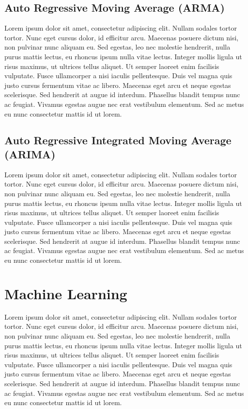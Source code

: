 \subsection{Auto Regressive Moving Average (ARMA)}
Lorem ipsum dolor sit amet, consectetur adipiscing elit. Nullam sodales tortor tortor. Nunc eget cursus dolor, id efficitur arcu. Maecenas posuere dictum nisi, non pulvinar nunc aliquam eu. Sed egestas, leo nec molestie hendrerit, nulla purus mattis lectus, eu rhoncus ipsum nulla vitae lectus. Integer mollis ligula ut risus maximus, ut ultrices tellus aliquet. Ut semper laoreet enim facilisis vulputate. Fusce ullamcorper a nisi iaculis pellentesque. Duis vel magna quis justo cursus fermentum vitae ac libero. Maecenas eget arcu et neque egestas scelerisque. Sed hendrerit at augue id interdum. Phasellus blandit tempus nunc ac feugiat. Vivamus egestas augue nec erat vestibulum elementum. Sed ac metus eu nunc consectetur mattis id ut lorem.

\subsection{Auto Regressive Integrated Moving Average (ARIMA)}
Lorem ipsum dolor sit amet, consectetur adipiscing elit. Nullam sodales tortor tortor. Nunc eget cursus dolor, id efficitur arcu. Maecenas posuere dictum nisi, non pulvinar nunc aliquam eu. Sed egestas, leo nec molestie hendrerit, nulla purus mattis lectus, eu rhoncus ipsum nulla vitae lectus. Integer mollis ligula ut risus maximus, ut ultrices tellus aliquet. Ut semper laoreet enim facilisis vulputate. Fusce ullamcorper a nisi iaculis pellentesque. Duis vel magna quis justo cursus fermentum vitae ac libero. Maecenas eget arcu et neque egestas scelerisque. Sed hendrerit at augue id interdum. Phasellus blandit tempus nunc ac feugiat. Vivamus egestas augue nec erat vestibulum elementum. Sed ac metus eu nunc consectetur mattis id ut lorem.

\section{Machine Learning}
Lorem ipsum dolor sit amet, consectetur adipiscing elit. Nullam sodales tortor tortor. Nunc eget cursus dolor, id efficitur arcu. Maecenas posuere dictum nisi, non pulvinar nunc aliquam eu. Sed egestas, leo nec molestie hendrerit, nulla purus mattis lectus, eu rhoncus ipsum nulla vitae lectus. Integer mollis ligula ut risus maximus, ut ultrices tellus aliquet. Ut semper laoreet enim facilisis vulputate. Fusce ullamcorper a nisi iaculis pellentesque. Duis vel magna quis justo cursus fermentum vitae ac libero. Maecenas eget arcu et neque egestas scelerisque. Sed hendrerit at augue id interdum. Phasellus blandit tempus nunc ac feugiat. Vivamus egestas augue nec erat vestibulum elementum. Sed ac metus eu nunc consectetur mattis id ut lorem.


